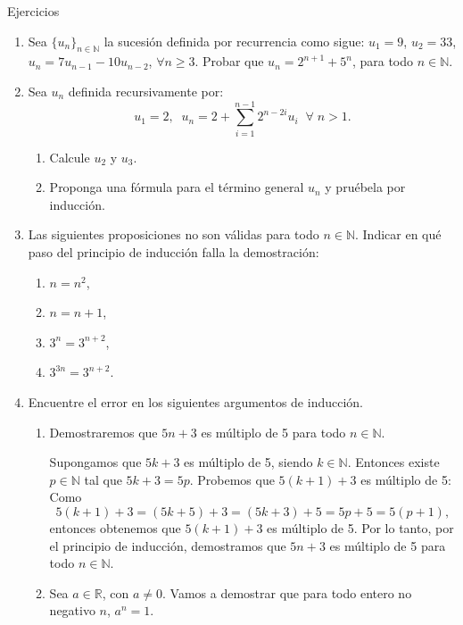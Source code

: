 \begin{section}{Ejercicios}
\begin{enumerate}
        \item Sea $\{ u_n \}_{n \in \mathbb N}$ la sucesión definida por recurrencia como sigue: $u_1 = 9$, $u_2 = 33$, $u_n = 7u_{n-1} - 10u_{n-2}$, $\forall n \geq 3$. Probar que $u_n = 2^{n+1} + 5^n$, para todo $n \in \mathbb N$.

        \item Sea $u_n$ definida recursivamente por: 
        $$u_1=2,\;\; u_n=2+\sum_{i=1}^{n-1}2^{n-2i}u_i \;\;\forall\; n >1.$$
        \begin{enumerate}
            \item Calcule $u_2$ y $u_3$.
            \item Proponga una fórmula para el término general $u_n$ y pruébela por inducción.
        \end{enumerate}

        \item Las siguientes proposiciones no son válidas para todo $n \in {\mathbb N}$. Indicar en qué paso del principio de inducción falla la demostración:
        \begin{multicols}{3}
        \begin{enumerate}
            \item  $n=n^2$,
            \item  $n=n+1$,
            \item  $3^n = 3^{n+2}$,
            \item  $3^{3n} = 3^{n+2}$.
        \end{enumerate}
        \end{multicols}

        \item Encuentre el error en los siguientes argumentos de inducción.
        \begin{enumerate}
            \item  Demostraremos que $5n+3$ es múltiplo de 5 para todo $n\in \mathbb N$.

            Supongamos que $5k+3$ es múltiplo de 5, siendo $k\in \mathbb N$. Entonces existe
            $p\in \mathbb N$ tal que  $5k+3=5p$. Probemos que $5(k+1)+3$ es múltiplo de 5:
            Como
            $$
            5(k+1)+3=(5k+5)+3=(5k+3)+5=5p+5=5(p+1),
            $$
            entonces obtenemos que $5(k+1)+3$ es múltiplo de 5. Por lo tanto, por el principio
            de inducción, demostramos que $5n+3$ es múltiplo de 5 para todo $n\in \mathbb
            N$.
            \item Sea $a\in\mathbb R$, con $a\neq 0$. Vamos a demostrar que para todo entero no negativo $n$, $a^n=1$.


\end{enumerate}
\end{enumerate}
\end{section}
